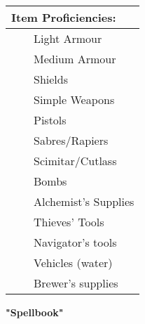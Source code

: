 \documentclass[11pt]{article}
\newcommand{\tabitem}{~~\llap{--}~~}
\begin{document}
\begin{multicols}{2}
\vspace{4mm}

\noindent \begin{tabularx}{95mm}{@{}l}
{\Large \textbf{Item Proficiencies:}} \\
\hline
\tabitem Light Armour \\
\tabitem Medium Armour \\
\tabitem Shields \\
\tabitem Simple Weapons \\
\tabitem Pistols \\
\tabitem Sabres/Rapiers \\
\tabitem Scimitar/Cutlass \\
\tabitem Bombs \\
\tabitem Alchemist's Supplies \\
\tabitem Thieves' Tools \\
\tabitem Navigator's tools \\
\tabitem Vehicles (water) \\
\tabitem Brewer's supplies
		\end{tabularx}
	\end{multicols}

\clearpage

	\begin{center}
{\LARGE \textbf{"Spellbook"}}
	\end{center}
\end{document}
